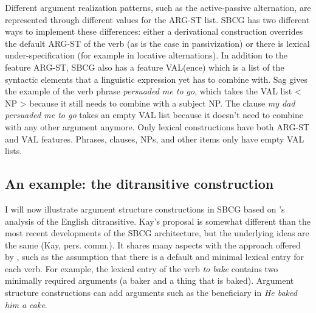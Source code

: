 Different argument realization patterns, such as the active-passive alternation, are represented through different values for the ARG-ST list. SBCG has two different ways to implement these differences: either a derivational construction overrides the default ARG-ST of the verb (as is the case in passivization) or there is lexical under-specification (for example in locative alternations). In addition to the feature ARG-ST, SBCG also has a feature VAL(ence) which is a list of the syntactic elements that a linguistic expression yet has to combine with. Sag gives the example of the verb phrase {\em persuaded me to go}, which takes the VAL list < NP > because it still needs to combine with a subject NP. The clause {\em my dad persuaded me to go} takes an empty VAL list because it doesn't need to combine with any other argument anymore. Only lexical constructions have both ARG-ST and VAL features. Phrases, clauses, NPs, and other items only have empty VAL lists. 

\subsection{An example: the ditransitive construction}

I will now illustrate argument structure constructions in SBCG based on \citet{kay05argument}'s analysis of the English ditransitive. Kay's proposal is somewhat different than the most recent developments of the SBCG architecture, but the underlying ideas are the same (Kay, pers. comm.). It shares many aspects with the approach offered by \citet{goldberg95construction}, such as the assumption that there is a default and minimal lexical entry for each verb. For example, the lexical entry of the verb {\em to bake} contains two minimally required arguments (a baker and a thing that is baked). Argument structure constructions can add arguments such as the beneficiary in {\em He baked him a cake}. 

